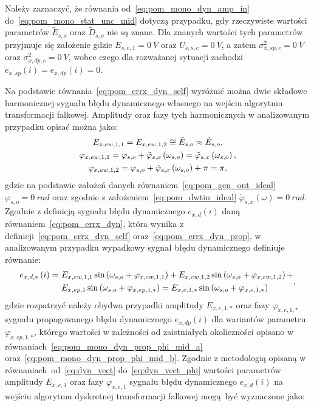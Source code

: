 Należy zaznaczyć, że równania od~\eqref{eq:pom_mono_dyn_amp_in} do~\eqref{eq:pom_mono_stat_unc_mid} dotyczą przypadku, gdy rzeczywiste wartości parametrów $\tilde{E}_{s,o}$ oraz $\tilde{D}_{s,o}$ nie są znane. Dla znanych wartości tych parametrów przyjmuje się założenie gdzie $E_{s,e,1} = \qty{0}{V}$ oraz $U_{s,s,c} = \qty{0}{V}$, a zatem $\sigma_{x,sp,c}^{2} = \qty{0}{V}$ oraz $\sigma_{x,dp,c}^{2} = \qty{0}{V}$, wobec czego dla rozważanej sytuacji zachodzi $e_{x,sp}(i) = e_{x,dp}(i) = 0$.

Na podstawie równania~\eqref{eq:pom_errx_dyn_self} wyróżnić można dwie składowe harmonicznej sygnału błędu dynamicznego własnego na wejściu algorytmu transformacji falkowej. Amplitudy oraz fazy tych harmonicznych w analizowanym przypadku opisać można jako:
\begin{gather}
E_{x,ew,1,1} = E_{x,ew,1,2} \cong \tilde{E}_{s,o} \approx \dot{E}_{s,o} \label{eq:pom_mono_dyn_self_amp_mid}, \\
\varphi_{x,ew,1,1} = \varphi_{s,o} + \tilde{\varphi}_{s,x} \left(\omega_{s,o}\right) = \tilde{\varphi}_{s,x} \left(\omega_{s,o}\right) \label{eq:pom_mono_dyn_self_phi_mid_1}, \\
\varphi_{x,ew,1,2} = \varphi_{s,o} + \dot{\varphi}_{s,x} \left(\omega_{s,o}\right) + \pi = \pi \label{eq:pom_mono_dyn_self_phi_mid_2},
\end{gather}
gdzie na podstawie założeń danych równaniem~\eqref{eq:pom_gen_out_ideal} $\varphi_{s,o} = \qty{0}{rad}$ oraz zgodnie z założeniem~\eqref{eq:pom_dwtin_ideal} $\dot{\varphi}_{s,x}(\omega) = \qty{0}{rad}$. Zgodnie z definicją sygnału błędu dynamicznego $e_{x,d}(i)$ daną równaniem~\eqref{eq:pom_errx_dyn}, która wynika z definicji~\eqref{eq:pom_errx_dyn_self} oraz~\eqref{eq:pom_errx_dyn_prop}, w analizowanym przypadku wypadkowy sygnał błędu dynamicznego definiuje równanie:
\begin{equation}
\begin{split}
e_{x,d,*} \left(i\right) =~
& E_{x,ew,1,1} \sin \left(\omega_{s,o} + \varphi_{x,ew,1,1}\right) + E_{x,ew,1,2} \sin \left(\omega_{s,o} + \varphi_{x,ew,1,2}\right) + \\
& E_{x,ep,1} \sin \left(\omega_{s,o} + \varphi_{x,ep,1,*}\right) = E_{x,e,1,*} \sin \left(\omega_{s,o} + \varphi_{x,e,1,*}\right)
\end{split}
\label{eq:pom_mono_dyn_sum_err_mid},
\end{equation}
gdzie rozpatrzyć należy obydwa przypadki amplitudy $E_{x,e,1,*}$ oraz fazy $\varphi_{x,e,1,*}$ sygnału propagowanego błędu dynamicznego $e_{x,dp}(i)$ dla wariantów parametru $\varphi_{x,ep,1,*}$, którego wartości w zależności od zaistniałych okoliczności opisano w równaniach~\eqref{eq:pom_mono_dyn_prop_phi_mid_a} oraz~\eqref{eq:pom_mono_dyn_prop_phi_mid_b}. Zgodnie z metodologią opisaną w równaniach~od~\eqref{eq:dyn_vect} do~\eqref{eq:dyn_vect_phi} wartości parametrów amplitudy $E_{x,e,1}$ oraz fazy $\varphi_{x,e,1}$ sygnału błędu dynamicznego $e_{x,d}(i)$ na wejściu algorytmu dyskretnej transformacji falkowej mogą być wyznaczone jako:
